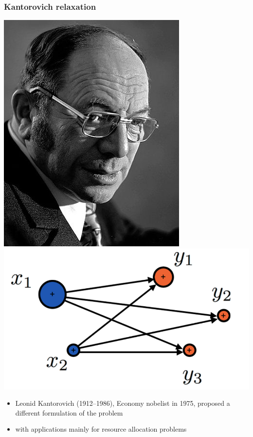 \documentclass[french,9pt]{beamer}
\begin{document}
\begin{frame}
  \frametitle{Kantorovich relaxation}
  \begin{center}
      \includegraphics[width=0.3\linewidth]{fig/kanto} \includegraphics[width=0.6\linewidth]{fig/alloc}
  \end{center}
\begin{itemize}
\item Leonid Kantorovich (1912--1986), Economy nobelist in 1975, proposed a different formulation of the problem
\item with applications mainly for resource allocation problems
\end{itemize}
\end{frame}
\end{document}
